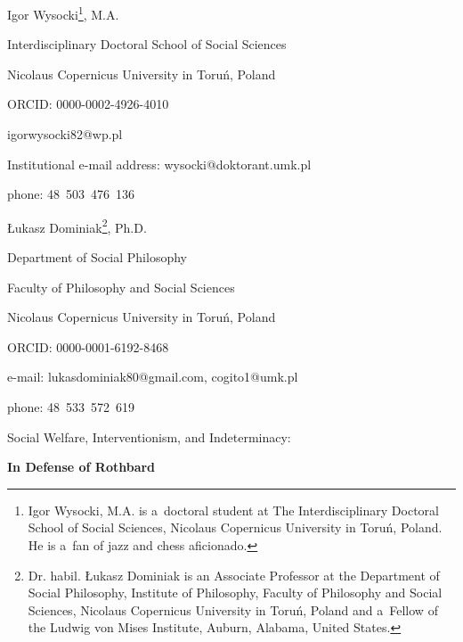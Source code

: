 \setcounter{secnumdepth}{0}







Igor Wysocki\footnote{Igor Wysocki, M.A. is a~doctoral student at The Interdisciplinary Doctoral School of Social Sciences, Nicolaus Copernicus University in Toruń, Poland. He is a~fan of jazz and chess aficionado. }, M.A.



Interdisciplinary Doctoral School of Social Sciences



Nicolaus Copernicus University in Toruń, Poland



ORCID: 0000-0002-4926-4010



igorwysocki82@wp.pl



Institutional e-mail address: wysocki@doktorant.umk.pl



phone: 48~503~476~136



Łukasz Dominiak\footnote{Dr. habil. Łukasz Dominiak is an Associate Professor at the Department of Social Philosophy, Institute of Philosophy, Faculty of Philosophy and Social Sciences, Nicolaus Copernicus University in Toruń, Poland and a~Fellow of the Ludwig von Mises Institute, Auburn, Alabama, United States.}, Ph.D.



Department of Social Philosophy



Faculty of Philosophy and Social Sciences



Nicolaus Copernicus University in Toruń, Poland



ORCID: 0000-0001-6192-8468



e-mail: lukasdominiak80@gmail.com, cogito1@umk.pl



phone: 48~533~572~619



Social Welfare, Interventionism, and Indeterminacy:





\textbf{In Defense of Rothbard}







